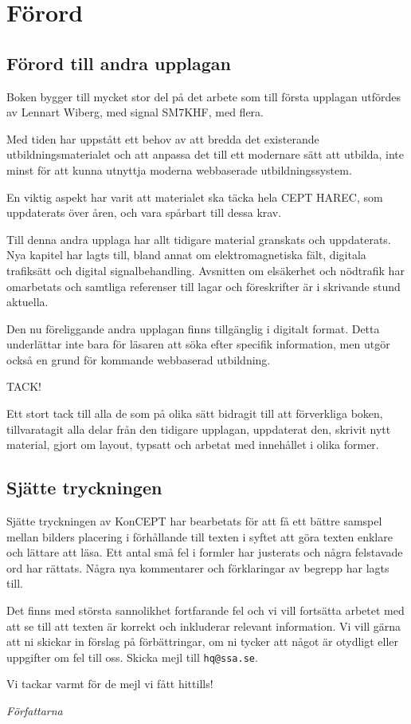 \chapter*{Förord}

\balance

\section*{Förord till andra upplagan}

Boken bygger till mycket stor del på det arbete som till första upplagan
utfördes av Lennart Wiberg, med signal SM7KHF, med flera.

Med tiden har uppstått ett behov av att bredda det existerande
utbildningsmaterialet och att anpassa det till ett modernare sätt att utbilda,
inte minst för att kunna utnyttja moderna webbaserade utbildningssystem.

En viktig aspekt har varit att materialet ska täcka hela CEPT HAREC,
som uppdaterats över åren, och vara spårbart till dessa krav.

Till denna andra upplaga har allt tidigare material granskats och uppdaterats.
Nya kapitel har lagts till, bland annat om elektromagnetiska fält, digitala
trafiksätt och digital signalbehandling.
Avsnitten om elsäkerhet och nödtrafik har omarbetats och samtliga referenser
till lagar och föreskrifter är i skrivande stund aktuella.

Den nu föreliggande andra upplagan finns tillgänglig i digitalt format.
Detta underlättar inte bara för läsaren att söka efter specifik information,
men utgör också en grund för kommande webbaserad utbildning.

TACK!

Ett stort tack till alla de som på olika sätt bidragit till att förverkliga
boken, tillvaratagit alla delar från den tidigare upplagan, uppdaterat
den, skrivit nytt material, gjort om layout, typsatt och arbetat med
innehållet i olika former.

\section*{Sjätte tryckningen}

Sjätte tryckningen av KonCEPT har bearbetats för att få ett bättre samspel mellan
bilders placering i förhållande till texten i syftet att göra texten enklare och
lättare att läsa.
Ett antal små fel i formler har justerats och några felstavade ord har rättats.
Några nya kommentarer och förklaringar av begrepp har lagts till.

Det finns med största sannolikhet fortfarande fel och vi vill fortsätta arbetet
med att se till att texten är korrekt och inkluderar relevant information.
Vi vill gärna att ni skickar in förslag på förbättringar, om ni tycker att något
är otydligt eller uppgifter om fel till oss.
Skicka mejl till \texttt{hq@ssa.se}.

\medskip

Vi tackar varmt för de mejl vi fått hittills!

\bigskip

\noindent\emph{Författarna}
